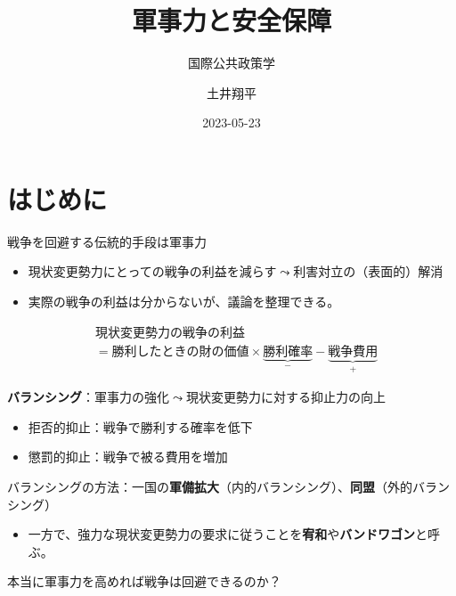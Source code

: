 \documentclass[
  xelatex,
  ja=standard]{bxjsarticle}
\title{軍事力と安全保障}
\subtitle{国際公共政策学}
\author{土井翔平}
\date{2023-05-23}
\providecommand{\tightlist}{%
  \setlength{\itemsep}{0pt}\setlength{\parskip}{0pt}}\usepackage{longtable,booktabs,array}
\begin{document}
\maketitle
\ifdefined\Shaded\renewenvironment{Shaded}{\begin{tcolorbox}[sharp corners, borderline west={3pt}{0pt}{shadecolor}, interior hidden, enhanced, boxrule=0pt, frame hidden, breakable]}{\end{tcolorbox}}\fi

\hypertarget{ux306fux3058ux3081ux306b}{%
\section*{はじめに}\label{ux306fux3058ux3081ux306b}}

戦争を回避する伝統的手段は軍事力

\begin{itemize}
\tightlist
\item
  現状変更勢力にとっての戦争の利益を減らす\(\leadsto\)利害対立の（表面的）解消
\item
  実際の戦争の利益は分からないが、議論を整理できる。
\end{itemize}

\[
\begin{split}
&\textrm{現状変更勢力の戦争の利益} \\
&= \textrm{勝利したときの財の価値} \times \underbrace{\textrm{勝利確率}}_{-} - \underbrace{\textrm{戦争費用}}_{+}
\end{split}
\]

\textbf{バランシング}：軍事力の強化\(\leadsto\)現状変更勢力に対する抑止力の向上

\begin{itemize}
\tightlist
\item
  拒否的抑止：戦争で勝利する確率を低下
\item
  懲罰的抑止：戦争で被る費用を増加
\end{itemize}

バランシングの方法：一国の\textbf{軍備拡大}（内的バランシング）、\textbf{同盟}（外的バランシング）

\begin{itemize}
\tightlist
\item
  一方で、強力な現状変更勢力の要求に従うことを\textbf{宥和}や\textbf{バンドワゴン}と呼ぶ\citep{schweller1994}。
\end{itemize}

本当に軍事力を高めれば戦争は回避できるのか？
\end{document}
